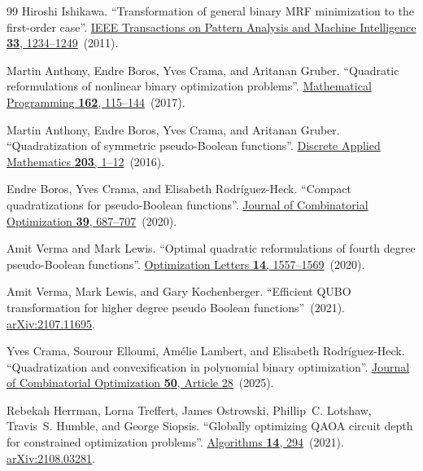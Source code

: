 \documentclass[a4paper,onecolumn,11pt,unpublished]{quantumarticle}
\theoremstyle{remark}
\begin{document}
\begin{thebibliography}{99}
Hiroshi Ishikawa.
\newblock ``Transformation of general binary MRF minimization to the first-order case''.
\newblock \href{https://dx.doi.org/10.1109/TPAMI.2010.91}{IEEE Transactions on Pattern Analysis and Machine Intelligence {\bf 33}, 1234--1249}~(2011).

Martin Anthony, Endre Boros, Yves Crama, and Aritanan Gruber.
\newblock ``Quadratic reformulations of nonlinear binary optimization problems''.
\newblock \href{https://dx.doi.org/10.1007/s10107-016-1032-4}{Mathematical Programming {\bf 162}, 115--144}~(2017).

Martin Anthony, Endre Boros, Yves Crama, and Aritanan Gruber.
\newblock ``Quadratization of symmetric pseudo-Boolean functions''.
\newblock \href{https://doi.org/10.1016/j.dam.2016.01.001}{Discrete Applied Mathematics {\bf 203}, 1--12}~(2016).

Endre Boros, Yves Crama, and Elisabeth Rodr{\'i}guez-Heck.
\newblock ``Compact quadratizations for pseudo-Boolean functions''.
\newblock \href{https://dx.doi.org/10.1007/s10878-019-00511-0}{Journal of Combinatorial Optimization {\bf 39}, 687--707}~(2020).

Amit Verma and Mark Lewis.
\newblock ``Optimal quadratic reformulations of fourth degree pseudo-Boolean functions''.
\newblock \href{https://dx.doi.org/10.1007/s11590-019-01460-7}{Optimization Letters {\bf 14}, 1557--1569}~(2020).

Amit Verma, Mark Lewis, and Gary Kochenberger.
\newblock ``Efficient QUBO transformation for higher degree pseudo Boolean functions''~(2021).
\newblock \href{http://arxiv.org/abs/2107.11695}{arXiv:2107.11695}.

Yves Crama, Sourour Elloumi, Am{\'e}lie Lambert, and Elisabeth Rodr{\'i}guez-Heck.
\newblock ``Quadratization and convexification in polynomial binary optimization''.
\newblock \href{https://dx.doi.org/10.1007/s10878-025-01334-y}{Journal of Combinatorial Optimization {\bf 50}, Article 28}~(2025).

Rebekah Herrman, Lorna Treffert, James Ostrowski, Phillip~C. Lotshaw, Travis~S. Humble, and George Siopsis.
\newblock ``Globally optimizing QAOA circuit depth for constrained optimization problems''.
\newblock \href{https://dx.doi.org/10.3390/a14100294}{Algorithms {\bf 14}, 294}~(2021).
\newblock \href{http://arxiv.org/abs/2108.03281}{arXiv:2108.03281}.


\end{thebibliography}
\end{document}
